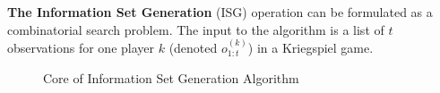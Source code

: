 \documentclass[10pt, conference, compsocconf]{IEEEtran}
\begin{document}

   
\textbf{The Information Set Generation}
(ISG) operation can be formulated as a combinatorial search problem.  The input to the algorithm is a list
of $t$ observations for one player $k$ (denoted $o_{1:t}^{(k)}$) in a Kriegspiel game.    
\begin{figure}[htpb]
\small
\begin{boxedminipage}{\columnwidth}
\begin{algorithmic}[1]
  \EndIf
\EndFunction
\end{algorithmic}
\end{boxedminipage}
\caption{Core of Information Set Generation Algorithm}
\label{codelisting1}
\vspace{-0.2in}
\end{figure}
\end{document}
